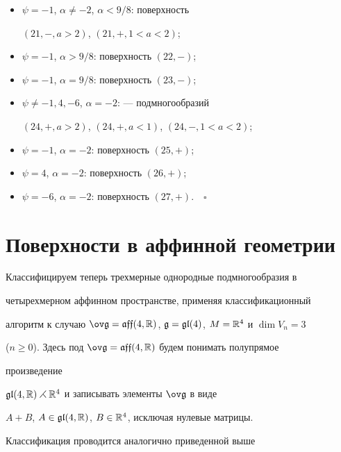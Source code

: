 \begin{itemize}


\item[] $\psi=-1$, $\alpha\ne-2$, $\alpha <9/8$: поверхность


$(21,-,a>2)$, $(21,+,1<a<2)$;


\item[] $\psi=-1$, $\alpha >9/8$: поверхность $(22,-)$;


\item[] $\psi=-1$, $\alpha =9/8$: поверхность $(23,-)$; 


\item[] $\psi\ne -1,4,-6$, $\alpha=-2$: --- подмногообразий 


$(24,+,a>2)$, $(24,+,a<1)$, $(24,-,1<a<2)$;


\item[] $\psi=-1$, $\alpha=-2$: поверхность $(25,+)$;


\item[] $\psi=4$, $\alpha=-2$: поверхность $(26,+)$;


\item[] $\psi=-6$, $\alpha=-2$: поверхность $(27,+).\quad\square$


\end{itemize}





\section{Поверхности в аффинной геометрии}





Классифицируем теперь трехмерные однородные подмногообразия в


четырехмерном аффинном пространстве, применяя классификационный


алгоритм к случаю $\gb=\aff{4}$, $\frak g=\frak{gl}(4)$, $M=\Bbb R^4$ и $\dim V_n=3$


($n\ge0$). Здесь под $\gb=\aff{4}$ будем понимать полупрямое


произведение


$\frak{gl}(4,\Bbb R)\rightthreetimes\Bbb R^4$ и записывать элементы $\gb$ в виде


$A+B$, $A\in \frak{gl}(4,\Bbb R)$, $B\in\Bbb R^4$, исключая нулевые матрицы.





Классификация проводится аналогично приведенной выше


